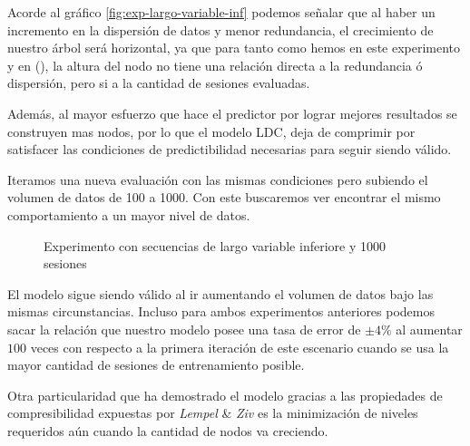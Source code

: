 	
	



	Acorde al gráfico \ref{fig:exp-largo-variable-inf} podemos señalar que al haber un incremento en la dispersión de datos y menor redundancia, el crecimiento de nuestro árbol será horizontal, ya que para tanto como hemos en este experimento y en (\label{expResult2}), la altura del nodo no tiene una relación directa a la redundancia ó dispersión, pero si a la cantidad de sesiones evaluadas. 
	
	Además, al mayor esfuerzo que hace el predictor por lograr mejores resultados se construyen mas nodos, por lo que el modelo LDC, deja de comprimir por satisfacer las condiciones de predictibilidad necesarias para seguir siendo válido.

	
	Iteramos una nueva evaluación con las mismas condiciones pero subiendo el volumen de datos de 100 a 1000. Con este buscaremos ver encontrar el mismo comportamiento a un mayor nivel de datos.
	


	
	
	\begin{figure}[t] 
		\centering
		\caption{Experimento con secuencias de largo variable inferiore y 1000 sesiones}
		\label{fig:sim}
	\end{figure}
	
	El modelo sigue siendo válido al ir aumentando el volumen de datos bajo las mismas circunstancias. Incluso para ambos experimentos anteriores podemos sacar la relación que nuestro modelo posee una tasa de error de $\pm4\%$ al aumentar $100$ veces con respecto a la primera iteración de este escenario cuando se usa la  mayor cantidad de sesiones de entrenamiento posible.


	Otra particularidad que ha demostrado el modelo gracias a las propiedades de compresibilidad expuestas por  \emph{Lempel} \& \emph{Ziv}\cite{ZivLempel1977} es la minimización de niveles requeridos aún cuando la cantidad de nodos va creciendo.
	

